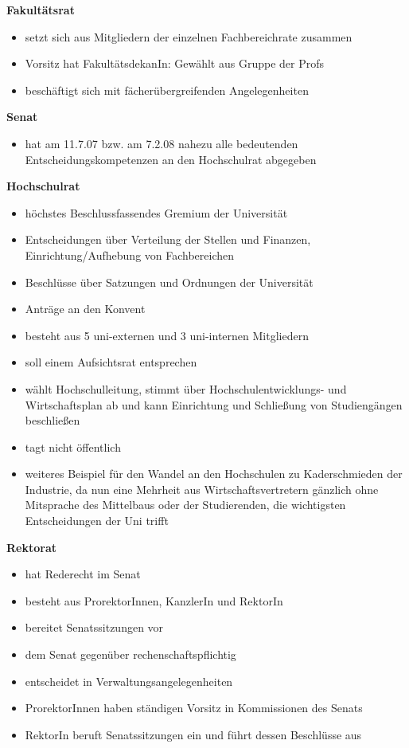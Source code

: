 \textbf{Fakultätsrat}
\begin{itemize}
 \item setzt sich aus Mitgliedern der einzelnen Fachbereichrate zusammen
  \item Vorsitz hat FakultätsdekanIn: Gewählt aus Gruppe der Profs
  \item beschäftigt sich mit fächerübergreifenden Angelegenheiten
\end{itemize}

\textbf{Senat}
\begin{itemize}
 \item hat am 11.7.07 bzw. am 7.2.08 nahezu alle bedeutenden Entscheidungskompetenzen an den Hochschulrat abgegeben
\end{itemize}

\textbf{Hochschulrat}
\begin{itemize}
 \item höchstes Beschlussfassendes Gremium der Universität
  \item Entscheidungen über Verteilung der Stellen und Finanzen, Einrichtung/Aufhebung von Fachbereichen
  \item Beschlüsse über Satzungen und Ordnungen der Universität
  \item Anträge an den Konvent
  \item besteht aus 5 uni-externen und 3 uni-internen Mitgliedern
  \item soll einem Aufsichtsrat entsprechen
  \item wählt Hochschulleitung, stimmt über Hochschulentwicklungs- \linebreak und Wirtschaftsplan ab und kann Einrichtung und Schließung von Studiengängen beschließen
  \item tagt nicht öffentlich
  \item weiteres Beispiel für den Wandel an den Hochschulen zu Kaderschmieden der Industrie, da nun eine Mehrheit aus Wirtschaftsvertretern gänzlich ohne Mitsprache des Mittelbaus oder der Studierenden, die wichtigsten Entscheidungen der Uni trifft
\end{itemize}

\textbf{Rektorat}
\begin{itemize}
 \item hat Rederecht im Senat
  \item besteht aus ProrektorInnen, KanzlerIn und RektorIn
  \item bereitet Senatssitzungen vor
  \item dem Senat gegenüber rechenschaftspflichtig
  \item entscheidet in Verwaltungsangelegenheiten
  \item ProrektorInnen haben ständigen Vorsitz in Kommissionen des Senats
  \item RektorIn beruft Senatssitzungen ein und führt dessen Beschlüsse aus
\end{itemize}

